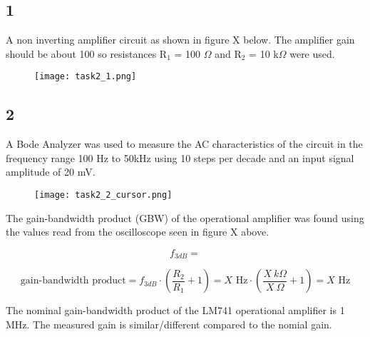 \subsection*{1}

    A non inverting amplifier circuit as shown in figure X below. The amplifier gain should be about 100 so resistances R$_1$ = 100 $\Omega$ and R$_2$ = 10 k$\Omega$ were used.

    \begin{figure}[h!]
        \centering
        \texttt{[image: task2\_1.png]}
    \end{figure}

\subsection*{2}

    A Bode Analyzer was used to measure the AC characteristics of the circuit in the frequency range 100 Hz to 50kHz using 10 steps per decade and an input signal amplitude of 20 mV.\\

    \begin{figure}[h!]
        \centering
        \texttt{[image: task2\_2\_cursor.png]}
    \end{figure}

    The gain-bandwidth product (GBW) of the operational amplifier was found using the values read from the oscilloscope seen in figure X above.

    $$f_{3dB} = $$

    $$\text{gain-bandwidth product} = f_{3dB} \cdot (\frac{R_2}{R_1} + 1) = X\text{ Hz} \cdot (\frac{X\ k \Omega}{X\ \Omega} + 1) = X \text{ Hz}$$

    The nominal gain-bandwidth product of the LM741 operational amplifier is 1 MHz. The measured gain is similar/different compared to the nomial gain.

